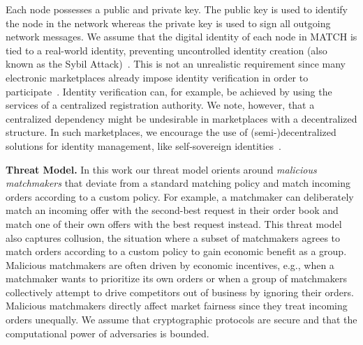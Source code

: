 Each node possesses a public and private key.
The public key is used to identify the node in the network whereas the private key is used to sign all outgoing network messages.
We assume that the digital identity of each node in MATCH is tied to a real-world identity, preventing uncontrolled identity creation (also known as the Sybil Attack)~\cite{douceur2002sybil}.
This is not an unrealistic requirement since many electronic marketplaces already impose identity verification in order to participate~\cite{damiani2003managing}.
Identity verification can, for example, be achieved by using the services of a centralized registration authority.
We note, however, that a centralized dependency might be undesirable in marketplaces with a decentralized structure.
In such marketplaces, we encourage the use of (semi-)decentralized solutions for identity management, like self-sovereign identities~\cite{muhle2018survey,stokkink2020truly}.

\textbf{Threat Model.}
In this work our threat model orients around \emph{malicious matchmakers} that deviate from a standard matching policy and match incoming orders according to a custom policy.
For example, a matchmaker can deliberately match an incoming offer with the second-best request in their order book and match one of their own offers with the best request instead.
This threat model also captures collusion, the situation where a subset of matchmakers agrees to match orders according to a custom policy to gain economic benefit as a group.
Malicious matchmakers are often driven by economic incentives, e.g., when a matchmaker wants to prioritize its own orders or when a group of matchmakers collectively attempt to drive competitors out of business by ignoring their orders.
Malicious matchmakers directly affect market fairness since they treat incoming orders unequally.
We assume that cryptographic protocols are secure and that the computational power of adversaries is bounded.


